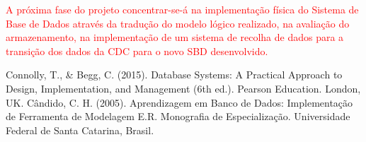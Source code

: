 \documentclass[a4paper,12pt]{scrreprt}
\begin{document}
    \textcolor{red}{A próxima fase do projeto concentrar-se-á na implementação física do Sistema de Base de Dados através da tradução do modelo lógico realizado, na avaliação do armazenamento, na implementação de um sistema de recolha de dados para a transição dos dados da CDC para o novo SBD desenvolvido.}





\begin{thebibliography}{9}
Connolly, T., \& Begg, C. (2015). Database Systems: A Practical Approach to Design, Implementation, and Management (6th ed.). Pearson Education. London, UK.
Cândido, C. H. (2005). Aprendizagem em Banco de Dados: Implementação de Ferramenta de Modelagem E.R. Monografia de Especialização. Universidade Federal de Santa Catarina, Brasil.
\end{thebibliography}




\renewcommand{\nomname}{Lista de Siglas e Acrónimos}

\end{document}
